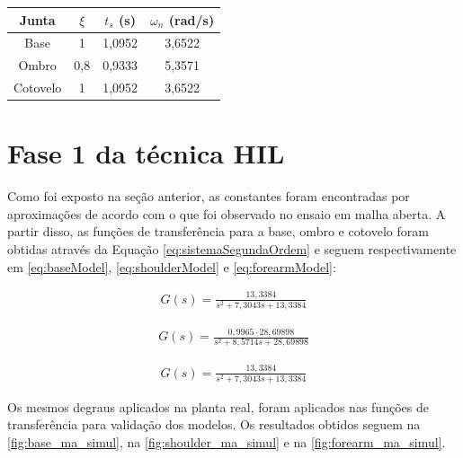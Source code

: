 \begin{center}
    \begin{tabular}{| c | c | c | c |}\hline
      \textbf{Junta}	& $\xi$ 	& $t_s$ (s)	& $\omega_n$ (rad/s)	\\ \hline
      Base		& 1 		& 1,0952	& 3,6522		\\ \hline
      Ombro		& 0,8 		& 0,9333	& 5,3571		\\ \hline
      Cotovelo		& 1 		& 1,0952	& 3,6522		\\ \hline
    \end{tabular}
    \label{tab:ctesModeloMA}
\end{center}

\section{Fase 1 da técnica HIL}

Como foi exposto na seção anterior, as constantes foram encontradas por aproximações de acordo
com o que foi observado no ensaio em malha aberta. A partir disso, as funções de transferência
para a base, ombro e cotovelo foram obtidas através da Equação \eqref{eq:sistemaSegundaOrdem} e 
seguem respectivamente em \eqref{eq:baseModel}, \eqref{eq:shoulderModel} e \eqref{eq:forearmModel}:

\begin{equation}
  \begin{gathered}
    G(s) = \frac{13,3384}{s^2 + 7,3043s + 13,3384}
  \end{gathered}
  \label{eq:baseModel}
\end{equation}

\begin{equation}
  \begin{gathered}
    G(s) = \frac{0,9965 \cdot 28,69898}{s^2 + 8,5714s + 28,69898}
  \end{gathered}
  \label{eq:shoulderModel}
\end{equation}

\begin{equation}
  \begin{gathered}
   G(s) = \frac{13,3384}{s^2 + 7,3043s + 13,3384}
  \end{gathered}
  \label{eq:forearmModel}
\end{equation}

Os mesmos degraus aplicados na planta real, foram aplicados nas funções de transferência para
validação dos modelos. Os resultados obtidos seguem na \autoref{fig:base_ma_simul}, na
\autoref{fig:shoulder_ma_simul} e na \autoref{fig:forearm_ma_simul}.

